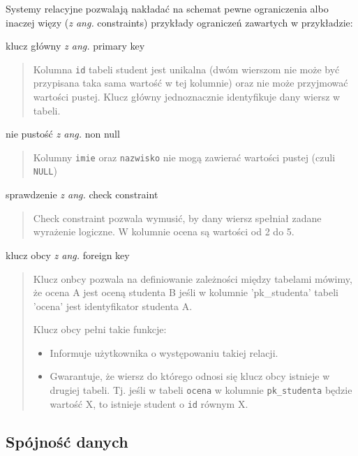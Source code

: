 \documentclass[a4paper]{article}
\begin{document}
Systemy relacyjne pozwalają nakładać na schemat pewne ograniczenia albo inaczej
więzy (\emph{z ang.} constraints) przykłady ograniczeń zawartych w przykładzie:

klucz główny \emph{z ang.} primary key
%
\begin{quote}

Kolumna \texttt{id} tabeli student jest unikalna (dwóm wierszom nie może być
przypisana taka sama wartość w tej kolumnie) oraz nie może przyjmować
wartości pustej. Klucz główny jednoznacznie identyfikuje dany wiersz w tabeli.

\end{quote}

nie pustość \emph{z ang.} non null
%
\begin{quote}

Kolumny \texttt{imie} oraz \texttt{nazwisko} nie mogą zawierać wartości pustej
(czuli \texttt{NULL})

\end{quote}

sprawdzenie \emph{z ang.} check constraint
%
\begin{quote}

Check constraint pozwala wymusić, by dany wiersz spełniał zadane wyrażenie
logiczne. W kolumnie ocena są wartości od 2 do 5.

\end{quote}

klucz obcy \emph{z ang.} foreign key
%
\begin{quote}

Klucz onbcy pozwala na definiowanie zależności między tabelami mówimy, że
ocena A jest oceną studenta B jeśli w kolumnie 'pk\_studenta' tabeli 'ocena' jest
identyfikator studenta A.

Klucz obcy pełni takie funkcje:
%
\begin{itemize}

\item Informuje użytkownika o występowaniu takiej relacji.

\item Gwarantuje, że wiersz do którego odnosi się klucz obcy istnieje w drugiej
tabeli. Tj. jeśli w tabeli \texttt{ocena} w kolumnie \texttt{pk\_studenta} będzie
wartość X, to istnieje student o \texttt{id} równym X.

\end{itemize}

\end{quote}


\subsection{Spójność danych%
  \label{spojnosc-danych}%
}
\end{document}
